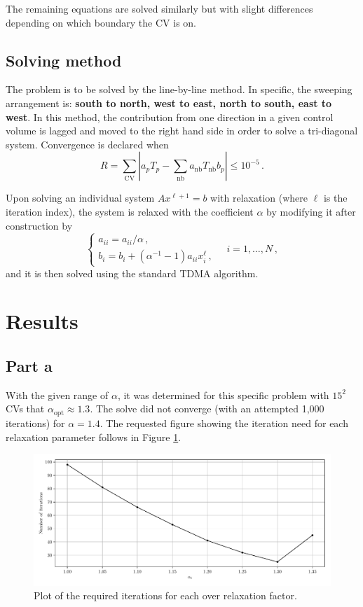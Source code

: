 \documentclass{article}
\begin{document}
The remaining equations are solved similarly but with slight differences depending on which boundary the CV is on.

\subsection*{Solving method}

The problem is to be solved by the line-by-line method. In specific, the sweeping arrangement is: \textbf{south to north, west to east, north to south, east to west}. In this method, the contribution from one direction in a given control volume is lagged and moved to the right hand side in order to solve a tri-diagonal system. Convergence is declared when
\begin{equation}
	R = \sum_\text{CV} \left| a_p T_p - \sum_{\text{nb}} a_\text{nb} T_\text{nb} b_p\right|\leq 10^{-5}\,.
\end{equation}

Upon solving an individual system $Ax^{\ell + 1} = b$ with relaxation (where $\ell$ is the iteration index), the system is relaxed with the coefficient $\alpha$ by modifying it after construction by
\[
	\begin{cases}
		a_{ii} = a_{ii} / \alpha\,,\\
		b_i = b_i + (\alpha^{-1} - 1) a_{ii} x_i^\ell\,,
	\end{cases} \quad i = 1, \ldots, N\,,
\]
and it is then solved using the standard TDMA algorithm.

\section*{Results}

\subsection*{Part a}

With the given range of $\alpha$, it was determined for this specific problem with $15^2$ CVs that $\alpha_\text{opt} \approx 1.3$. The solve did not converge (with an attempted 1,000 iterations) for $\alpha = 1.4$. The requested figure showing the iteration need for each relaxation parameter follows in Figure \ref{fig:iterations}.

\begin{figure}[H]
	\centering
	\includegraphics[width=\linewidth]{../python/iterations}
	\caption{Plot of the required iterations for each over relaxation factor.}
	\label{fig:iterations}
\end{figure}
\end{document}
